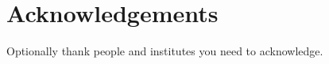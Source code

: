 \section*{Acknowledgements}
\label{}

Optionally thank people and institutes you need to acknowledge. 